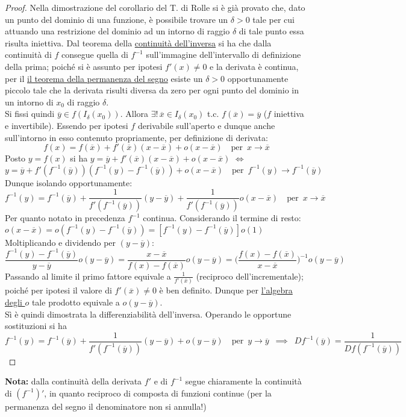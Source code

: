 \documentclass[10pt, oneside]{book}
\theoremstyle{plain}
\begin{document}
\begin{proof}
Nella dimostrazione del corollario del T. di Rolle si è già provato che, dato un punto del dominio di una funzione, è possibile trovare un $\delta > 0$ tale per cui attuando una restrizione del dominio ad un intorno di raggio $\delta$ di tale punto essa risulta iniettiva. Dal teorema della \hyperlink{inversa}{continuità dell'inversa} si ha che dalla continuità di $f$ consegue quella di $f^{-1}$ sull'immagine dell'intervallo di definizione della prima; poiché si è assunto per ipotesi $f'(x) \neq 0$ e la derivata è continua, per il \hyperref[subsubsec:perman]{il teorema della permanenza del segno} esiste un $\delta > 0$ opportunamente piccolo tale che la derivata risulti diversa da zero per ogni punto del dominio in un intorno di $x_0$ di raggio $\delta$. \\
Si fissi quindi $\overline{y} \in f(I_\delta(x_0))$. Allora $\exists! \, \overline{x} \in I_\delta(x_0)$ t.c. $f(\overline{x}) = \overline{y}$ ($f$ iniettiva e invertibile). Essendo per ipotesi $f$ derivabile sull'aperto e dunque anche sull'intorno in esso contenuto propriamente, per definizione di derivata:
\[f(x) = f(\overline{x}) + f'(\overline{x}) (x - \overline{x}) + o (x - \overline{x}) \quad \textrm{per} \enspace x \rightarrow \overline{x}\]
Posto $y = f(x)$ si ha $y = \overline{y} + f'(\overline{x}) (x - \overline{x}) + o (x - \overline{x})$ $\Leftrightarrow$ $y = \overline{y} + f'(f^{-1}(\overline{y})) (f^{-1}(y) - f^{-1}(\overline{y})) + o (x - \overline{x}) \quad \textrm{per} \enspace f^{-1}(y) \rightarrow f^{-1}(\overline{y})$
\\Dunque isolando opportunamente:
\[f^{-1}(y) = f^{-1}(\overline{y}) + \frac{1}{f'(f^{-1}(\overline{y}))}(y - \overline{y}) + \frac{1}{f'(f^{-1}(\overline{y}))} o(x - \overline{x}) \quad \textrm{per} \enspace x \rightarrow \overline{x}\]
Per quanto notato in precedenza $f^{-1}$ continua. Considerando il termine di resto: $o(x - \overline{x}) = o (f^{-1}(y) - f^{-1}(\overline{y})) = [f^{-1}(y) - f^{-1}(\overline{y})]o(1)$
\hypertarget{cus}{Moltiplicando e dividendo} per $(y - \overline{y})$:
\[\frac{f^{-1}(y) - f^{-1}(\overline{y})}{y - \overline{y}} o(y - \overline{y}) = \frac{x - \overline{x}}{f(x) - f(\overline{x})}o(y - \overline{y}) = \bigg(\frac{f(x) - f(\overline{x})}{x - \overline{x}}\bigg)^{-1}o(y - \overline{y})\]
Passando al limite il primo fattore equivale a $\displaystyle \frac{1}{f'(\overline{x})}$ (reciproco dell'incrementale); poiché per ipotesi il valore di $f'(\overline{x}) \neq 0$ è ben definito. Dunque per \hyperlink{opiccoli}{l'algebra degli $o$} tale prodotto equivale a $o(y - \overline{y})$.
\\Sì è quindi dimostrata la differenziabilità dell'inversa. Operando le opportune sostituzioni si ha
\[f^{-1}(y) = f^{-1}(\overline{y}) + \frac{1}{f'(f^{-1}(\overline{y}))}(y - \overline{y}) + o(y - \overline{y}) \quad \textrm{per} \enspace y \rightarrow \overline{y} \enspace \implies \enspace Df^{-1}(\overline{y}) = \frac{1}{Df(f^{-1}(\overline{y}))}\]
\end{proof}
\textbf{Nota:} dalla continuità della derivata $f'$ e di $f^{-1}$ segue chiaramente la continuità di $(f^{-1})'$, in quanto reciproco di composta di funzioni continue (per la permanenza del segno il denominatore non si annulla!)
\end{document}
